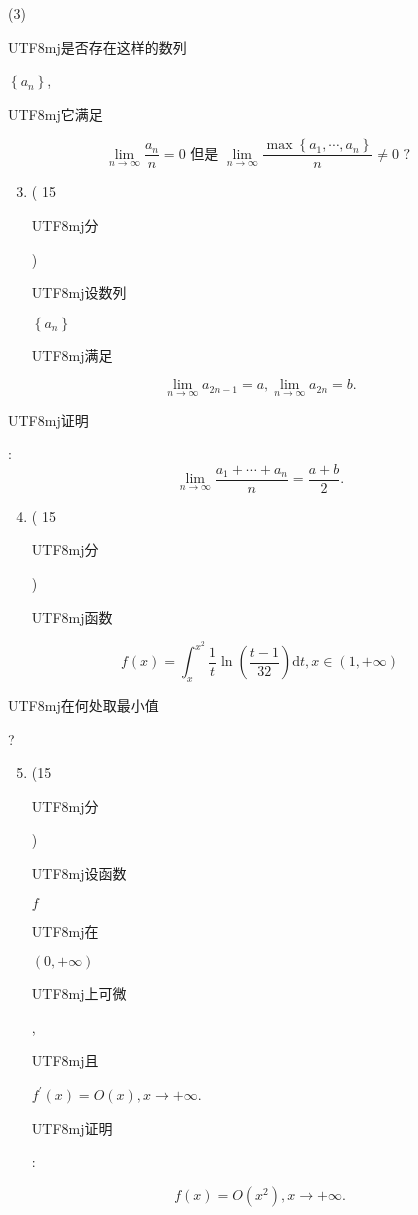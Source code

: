 \documentclass[10pt]{article}
\begin{document}
(3) \begin{CJK}{UTF8}{mj}是否存在这样的数列\end{CJK} $\left\{a_{n}\right\}$, \begin{CJK}{UTF8}{mj}它满足\end{CJK}
$$
\lim _{n \rightarrow \infty} \frac{a_{n}}{n}=0 \text { 但是 } \lim _{n \rightarrow \infty} \frac{\max \left\{a_{1}, \cdots, a_{n}\right\}}{n} \neq 0 \text { ? }
$$

\begin{enumerate}
  \setcounter{enumi}{2}
  \item ( 15 \begin{CJK}{UTF8}{mj}分\end{CJK}) \begin{CJK}{UTF8}{mj}设数列\end{CJK} $\left\{a_{n}\right\}$ \begin{CJK}{UTF8}{mj}满足\end{CJK}
\end{enumerate}
$$
\lim _{n \rightarrow \infty} a_{2 n-1}=a, \lim _{n \rightarrow \infty} a_{2 n}=b .
$$
\begin{CJK}{UTF8}{mj}证明\end{CJK}:
$$
\lim _{n \rightarrow \infty} \frac{a_{1}+\cdots+a_{n}}{n}=\frac{a+b}{2} .
$$

\begin{enumerate}
  \setcounter{enumi}{3}
  \item ( 15 \begin{CJK}{UTF8}{mj}分\end{CJK}) \begin{CJK}{UTF8}{mj}函数\end{CJK}
\end{enumerate}
$$
f(x)=\int_{x}^{x^{2}} \frac{1}{t} \ln \left(\frac{t-1}{32}\right) \mathrm{d} t, x \in(1,+\infty)
$$
\begin{CJK}{UTF8}{mj}在何处取最小值\end{CJK}?

\begin{enumerate}
  \setcounter{enumi}{4}
  \item (15 \begin{CJK}{UTF8}{mj}分\end{CJK}) \begin{CJK}{UTF8}{mj}设函数\end{CJK} $f$ \begin{CJK}{UTF8}{mj}在\end{CJK} $(0,+\infty)$ \begin{CJK}{UTF8}{mj}上可微\end{CJK}, \begin{CJK}{UTF8}{mj}且\end{CJK} $f^{\prime}(x)=O(x), x \rightarrow+\infty$. \begin{CJK}{UTF8}{mj}证明\end{CJK}:
\end{enumerate}
$$
f(x)=O\left(x^{2}\right), x \rightarrow+\infty .
$$
\end{document}
